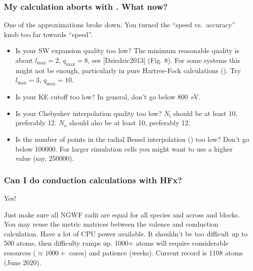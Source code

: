 \documentclass[letterpaper,10pt,english]{sphinxmanual}
\begin{document}
\subsubsection{My calculation aborts with . What now?}
\label{\detokenize{hfx:my-calculation-aborts-with-exchange-matrix-not-deemed-accurate-enough-for-a-stable-calculation-what-now}}
One of the approximations broke down. You turned the “speed
vs. accuracy” knob too far towards “speed”.
\begin{itemize}
\item {} 
Is your SW expansion quality too low? The minimum reasonable quality
is about \(l_{\textrm{max}}=2\), \(q_{\textrm{max}}=8\), see
{[}Dziedzic2013{]} (Fig. 8). For some systems this might not be
enough, particularly in pure Hartree-Fock calculations
(). Try \(l_{\textrm{max}}=3\),
\(q_{\textrm{max}}=10\).

\item {} 
Is your KE cutoff too low? In general, don’t go below 800 eV.

\item {} 
Is your Chebyshev interpolation quality too low?
\(N_{\textrm{i}}\) should be at least 10, preferably 12.
\(N_{\textrm{o}}\) should also be at least 10, preferably 12.

\item {} 
Is the number of points in the radial Bessel interpolation
() too low? Don’t go below 100000. For larger
simulation cells you might want to use a higher value (say, 250000).

\end{itemize}


\subsubsection{Can I do conduction calculations with HFx?}
\label{\detokenize{hfx:can-i-do-conduction-calculations-with-hfx}}
Yes!

Just make sure all NGWF radii are equal for all species and across
 and  blocks. You may reuse the metric
matrices between the valence and conduction calculation. Have a lot of
CPU power available. It shouldn’t be too difficult up to 500 atoms, then
difficulty ramps up. 1000+ atoms will require considerable resources
(\(\approx{}1000+\) cores) and patience (weeks). Current record is
1108 atoms (June 2020).
\end{document}
